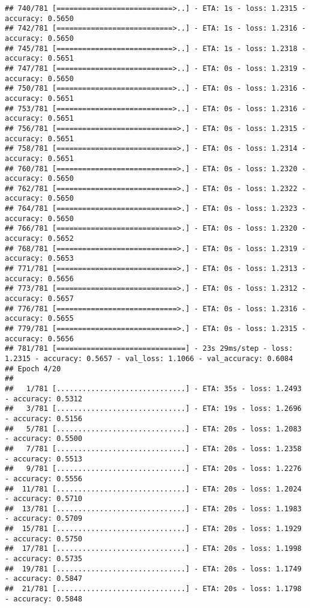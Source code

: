 \documentclass[
]{article}
\begin{document}
\begin{verbatim}
## 740/781 [===========================>..] - ETA: 1s - loss: 1.2315 - accuracy: 0.5650
## 742/781 [===========================>..] - ETA: 1s - loss: 1.2316 - accuracy: 0.5650
## 745/781 [===========================>..] - ETA: 1s - loss: 1.2318 - accuracy: 0.5651
## 747/781 [===========================>..] - ETA: 0s - loss: 1.2319 - accuracy: 0.5650
## 750/781 [===========================>..] - ETA: 0s - loss: 1.2316 - accuracy: 0.5651
## 753/781 [===========================>..] - ETA: 0s - loss: 1.2316 - accuracy: 0.5651
## 756/781 [============================>.] - ETA: 0s - loss: 1.2315 - accuracy: 0.5651
## 758/781 [============================>.] - ETA: 0s - loss: 1.2314 - accuracy: 0.5651
## 760/781 [============================>.] - ETA: 0s - loss: 1.2320 - accuracy: 0.5650
## 762/781 [============================>.] - ETA: 0s - loss: 1.2322 - accuracy: 0.5650
## 764/781 [============================>.] - ETA: 0s - loss: 1.2323 - accuracy: 0.5650
## 766/781 [============================>.] - ETA: 0s - loss: 1.2320 - accuracy: 0.5652
## 768/781 [============================>.] - ETA: 0s - loss: 1.2319 - accuracy: 0.5653
## 771/781 [============================>.] - ETA: 0s - loss: 1.2313 - accuracy: 0.5656
## 773/781 [============================>.] - ETA: 0s - loss: 1.2312 - accuracy: 0.5657
## 776/781 [============================>.] - ETA: 0s - loss: 1.2316 - accuracy: 0.5655
## 779/781 [============================>.] - ETA: 0s - loss: 1.2315 - accuracy: 0.5656
## 781/781 [==============================] - 23s 29ms/step - loss: 1.2315 - accuracy: 0.5657 - val_loss: 1.1066 - val_accuracy: 0.6084
## Epoch 4/20
## 
##   1/781 [..............................] - ETA: 35s - loss: 1.2493 - accuracy: 0.5312
##   3/781 [..............................] - ETA: 19s - loss: 1.2696 - accuracy: 0.5156
##   5/781 [..............................] - ETA: 20s - loss: 1.2083 - accuracy: 0.5500
##   7/781 [..............................] - ETA: 20s - loss: 1.2358 - accuracy: 0.5513
##   9/781 [..............................] - ETA: 20s - loss: 1.2276 - accuracy: 0.5556
##  11/781 [..............................] - ETA: 20s - loss: 1.2024 - accuracy: 0.5710
##  13/781 [..............................] - ETA: 20s - loss: 1.1983 - accuracy: 0.5709
##  15/781 [..............................] - ETA: 20s - loss: 1.1929 - accuracy: 0.5750
##  17/781 [..............................] - ETA: 20s - loss: 1.1998 - accuracy: 0.5735
##  19/781 [..............................] - ETA: 20s - loss: 1.1749 - accuracy: 0.5847
##  21/781 [..............................] - ETA: 20s - loss: 1.1798 - accuracy: 0.5848

\end{verbatim}
\end{document}
